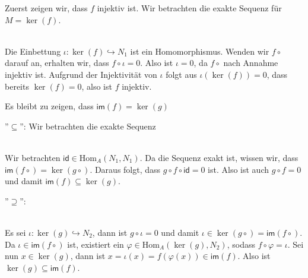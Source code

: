 \documentclass{article}
\theoremstyle{definition}
\theoremstyle{plain}
\theoremstyle{remark}
\newcommand{\im}{\mathsf{im}}
\begin{document}
Zuerst zeigen wir, dass $f$ injektiv ist.
Wir betrachten die exakte Sequenz für $M=\ker(f)$.
\begin{figure}[h]
\centering
{}
\end{figure} \\
Die Einbettung $\iota:\ker(f)\hookrightarrow N_1$ ist ein Homomorphismus. Wenden wir $f\circ$ darauf an, erhalten wir, dass $f\circ\iota=0$. Also ist $\iota=0$, da $f\circ$ nach Annahme injektiv ist. Aufgrund der Injektivität von $\iota$ folgt aus $\iota(\ker(f))=0$, dass bereits $\ker(f)=0$, also ist $f$ injektiv. \medskip

Es bleibt zu zeigen, dass $\im(f)=\ker(g)$\smallskip

\noindent ''$\subseteq$'': Wir betrachten die exakte Sequenz
\begin{figure}[h]
\centering
{}
\end{figure} \\
Wir betrachten $\mathsf{id}\in \mathrm{Hom}_A(N_1,N_1)$. Da die Sequenz exakt ist, wissen wir, dass $\im(f\circ)=\ker(g\circ)$. Daraus folgt, dass $g\circ f \circ\mathsf{id}=0$ ist. Also ist auch $g\circ f=0$ und damit $\im(f)\subseteq\ker(g)$. \smallskip

\noindent''$\supseteq$'': 
\begin{figure}[ht!]
\centering
{}
\end{figure} \\
Es sei $\iota:\ker(g)\hookrightarrow N_2$, dann ist $g\circ\iota =0$ und damit $\iota\in\ker(g\circ)=\im(f\circ)$. Da $\iota\in\im(f\circ)$ ist, existiert ein $\varphi\in\mathrm{Hom}_A(\ker(g),N_2)$, sodass $f\circ \varphi =\iota$.
Sei nun $x\in\ker(g)$, dann ist $x=\iota(x)=f(\varphi(x))\in\im(f)$. Also ist $\ker(g)\subseteq\im(f)$. 
\end{document}
